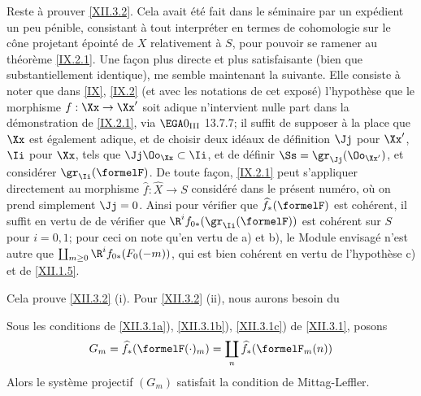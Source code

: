 Reste \`a prouver \ref{XII.3.2}. Cela avait \'et\'e fait dans le
s\'eminaire par un exp\'edient un peu p\'enible, consistant \`a tout
interpr\'eter en termes de cohomologie sur le c\^{o}ne projetant
\'epoint\'e de $X$ relativement \`a $S$, pour pouvoir se ramener au
th\'eor\`eme \ref{IX.2.1}. Une fa\c con plus directe et plus
satisfaisante (bien que substantiellement identique), me semble
maintenant la suivante. Elle consiste \`a noter que dans \ref{IX},
\numero \ref{IX.2}\label{XII.14} (et avec les
notations de cet expos\'e) l'hypoth\`ese que le morphisme
$f:\Xx\to\Xx'$ soit adique n'intervient nulle part dans la
d\'emonstration de \ref{IX.2.1}, via $\EGA 0_{\textup{III}}$ 13.7.7;
il suffit de supposer \`a la place que $\Xx$ est \'egalement adique,
et de choisir deux id\'eaux de d\'efinition $\Jj$ pour $\Xx'$, $\Ii$
pour $\Xx$, tels que $\Jj\Oo_\Xx\subset\Ii$, et de d\'efinir
$\Ss=\gr_\Jj(\Oo_{\Xx'})$, et consid\'erer $\gr_\Ii(\formelF)$. De
toute fa\c con, \ref{IX.2.1} peut s'appliquer directement au
morphisme $\widehat{f}:\widehat{X}\to S$ consid\'er\'e dans le pr\'esent
num\'ero, o\`u on prend simplement $\Jj=0$. Ainsi pour v\'erifier que
$\widehat{f}_\ast(\formelF)$ est coh\'erent, il suffit en vertu de
\loccit de v\'erifier que $\R^if_{0\ast}(\gr_\Ii(\formelF))$ est
coh\'erent sur $S$ pour $i=0, 1$; pour ceci on note qu'en vertu de
a) et b), le Module envisag\'e n'est autre que
$\coprod_{m\geq 0}\R^if_{0\ast}(F_0(-m))$, qui
est bien coh\'erent en vertu de l'hypoth\`ese c) et de
\ref{XII.1.5}.

Cela prouve \ref{XII.3.2} (i). Pour \ref{XII.3.2} (ii), nous aurons besoin du

\begin{lemme} \label{XII.3.3}
Sous les conditions de \ref{XII.3.1a}), \ref{XII.3.1b}), \ref{XII.3.1c}) de \ref{XII.3.1}, posons
\[
G_m= \widehat{f}_\ast(\formelF(\cdot)_m) = \coprod_n\widehat{f}_\ast(\formelF_m(n))
\]
Alors le syst\`eme projectif $(G_m)$ satisfait la condition de Mittag-Leffler.
\end{lemme}

